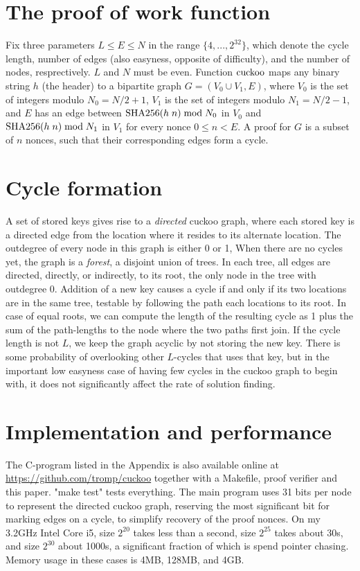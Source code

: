 \documentclass[11pt, oneside]{article}
\newcommand{\cuckoo}{{\rm cuckoo}}
\newcommand{\sha}{{\rm SHA256}}
\begin{document}
\section{The proof of work function}
Fix three parameters $L \leq E \leq N$ in the range $\{4,...,2^{32}\}$, which
denote the cycle length, number of edges (also easyness, opposite of
difficulty),
and the number of nodes, resprectively. $L$ and $N$ must be even.
Function $\cuckoo$ maps any binary string $h$ (the header) to a bipartite graph
$G = (V_0 \cup V_1, E)$, where $V_0$ is the set of integers modulo $N_0=N/2+1$,
$V_1$ is the set of integers modulo $N_1=N/2-1$, and $E$ has an edge between
$\sha(h\;n) \bmod N_0$ in $V_0$ and $\sha(h\;n) \bmod N_1$ in $V_1$ for every
nonce $0 \leq n < E$.  A proof for $G$ is a subset of $n$ nonces, such that
their corresponding edges form a cycle.

\section{Cycle formation}
A set of stored keys gives rise to a {\em directed} cuckoo graph, where each
stored key is a directed edge from the location where it resides to its
alternate location. The outdegree of every node in this
graph is either 0 or 1, When there are no cycles yet, the graph is a {\em
forest}, a disjoint union of trees. In each tree, all edges are directed,
directly, or indirectly, to its root,
the only node in the tree with outdegree 0. Addition of a new key causes a
cycle if and only if its two locations are in the same tree, testable
by following the path each locations to its root.
In case of equal roots, we can compute the length of the resulting cycle as
1 plus the sum of the path-lengths to the node where the two paths first join.
If the cycle length is not $L$, we keep the graph
acyclic by not storing the new key. There is some probability of overlooking
other $L$-cycles
that uses that key, but in the important low easyness case of having few cycles
in the cuckoo graph to begin with, it does not significantly affect
the rate of solution finding.

\section{Implementation and performance}
The C-program listed in the Appendix is also available online at
\url{https://github.com/tromp/cuckoo} together with a Makefile,
proof verifier and this paper. "make test" tests everything.
The main program uses 31 bits per node to represent the
directed cuckoo graph, reserving the most significant bit
for marking edges on a cycle, to simplify recovery of the proof nonces.
On my 3.2GHz Intel Core i5, size $2^{20}$ takes less than a second, size
$2^{25}$ takes about 30s, and size $2^{30}$ about 1000s, a significant fraction
of which is spend pointer chasing.
Memory usage in these cases is 4MB, 128MB, and 4GB.
\end{document}
